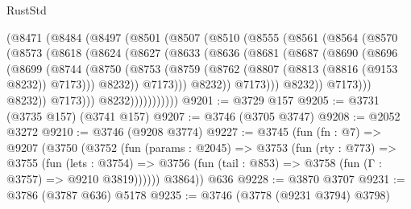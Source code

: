 \begin{lexlean}{RustStd}
\begin{coremodule}
                (@8471
                  (@8484
                    (@8497
                      (@8501
                        (@8507
                          (@8510
                            (@8555
                              (@8561
                                (@8564
                                  (@8570
                                    (@8573
                                      (@8618
                                        (@8624
                                          (@8627
                                            (@8633
                                              (@8636
                                                (@8681
                                                  (@8687
                                                    (@8690
                                                      (@8696
                                                        (@8699
                                                          (@8744
                                                            (@8750
                                                              (@8753
                                                                (@8759
                                                                  (@8762
                                                                    (@8807
                                                                      (@8813
                                                                        (@8816 (@9153 @8232))
                                                                        @7173)))
                                                                  @8232))
                                                              @7173)))
                                                        @8232))
                                                    @7173)))
                                              @8232))
                                          @7173)))
                                    @8232))
                                @7173)))
                          @8232)))))))))))
@9201 := @3729 @157
@9205 := @3731 (@3735 @157) (@3741 @157)
@9207 := @3746 (@3705 @3747)
@9208 := @2052 @3272
@9210 := @3746 (@9208 @3774)
@9227 := @3745
    (fun (fn : @7) =>
    @9207
      (@3750
        (@3752
          (fun (params : @2045) =>
          @3753
            (fun (rty : @773) =>
            @3755
              (fun (lets : @3754) =>
              @3756 (fun (tail : @853) => @3758 (fun (Γ : @3757) => @9210 @3819))))))
        @3864))
    @636
@9228 := @3870 @3707
@9231 := @3786 (@3787 @636) @5178
@9235 := @3746 (@3778 (@9231 @3794) @3798)

\end{coremodule}
\end{lexlean}
